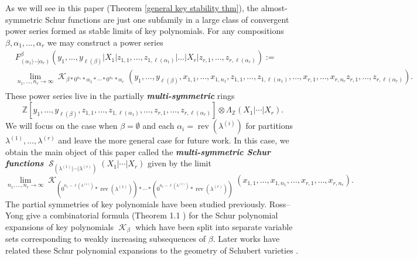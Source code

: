 \documentclass[12pt,reqno]{amsart}
\theoremstyle{definition}
\DeclareMathOperator{\rev}{rev}
\DeclareMathOperator{\cK}{\mathcal{K}}
\DeclareMathOperator{\cS}{\mathcal{S}}
\begin{document}
As we will see in this paper (Theorem \ref{general key stability thm}), the almost-symmetric Schur functions are just one subfamily in a large class of convergent power series formed as stable limits of key polynomials. For any compositions $\beta,\alpha_1,\ldots,\alpha_r$ we may construct a power series
\begin{align*}
    &F_{(\alpha_1|\cdots |\alpha_r)}^{\beta}(y_1,\ldots,y_{\ell(\beta)}|X_1 |z_{1,1},\ldots,z_{1,\ell(\alpha_1)}|\ldots|X_r|z_{r,1},\ldots,z_{r,\ell(\alpha_r)}):= \\
    & \lim_{n_1,\ldots , n_r \rightarrow \infty}\cK_{\beta*0^{n_1}*\alpha_1*\cdots * 0^{n_r}*\alpha_r}(y_1,\ldots,y_{\ell(\beta)}, x_{1,1},\ldots,x_{1,n_{1}},z_{1,1},\ldots,z_{1,\ell(\alpha_1)},\ldots, x_{r,1},\ldots,x_{r,n_r}z_{r,1},\ldots,z_{r,\ell(\alpha_r)}). \\
\end{align*}
These power series live in the partially \textbf{\textit{multi-symmetric}} rings 
$$\mathbb{Z}[y_1,\ldots,y_{\ell(\beta)},z_{1,1},\ldots,z_{1,\ell(\alpha_1)},\ldots,z_{r,1},\ldots,z_{r,\ell(\alpha_r)}]\otimes \Lambda_{\mathbb{Z}}(X_1|\cdots|X_r).$$ We will focus on the case when $\beta = \emptyset$ and each $\alpha_i = \rev(\lambda^{(i)})$ for partitions $\lambda^{(1)},\ldots, \lambda^{(r)}$ and leave the more general case for future work. In this case, we obtain the main object of this paper called the \textbf{\textit{multi-symmetric Schur functions}} $\cS_{(\lambda^{(1)}|\cdots| \lambda^{(r)})}(X_1|\cdots |X_r)$ given by the limit
$$\lim_{n_1,\ldots,n_r \rightarrow \infty}\cK_{(0^{n_1-\ell(\lambda^{(1)})}*\rev(\lambda^{(1)}))*\cdots * (0^{n_r-\ell(\lambda^{(r)})}*\rev(\lambda^{(r)}))}(x_{1,1},\ldots,x_{1,n_1},\ldots,x_{r,1},\ldots,x_{r,n_r}).$$ The partial symmetries of key polynomials have been studied previously. Ross--Yong give a combinatorial formula (Theorem 1.1 \cite{RY15}) for the Schur polynomial expansions of key polynomials $\cK_{\beta}$ which have been split into separate variable sets corresponding to weakly increasing subsequences of $\beta.$ Later works have related these Schur polynomial expansions to the geometry  of Schubert varieties \cite{HY22} \cite{GHY21}.
\end{document}

